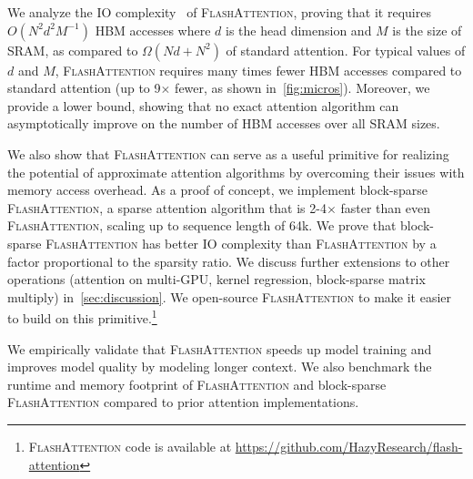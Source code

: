 We analyze the IO complexity~\citep{aggarwal1988input} of \textsc{FlashAttention}, proving that it requires $O(N^2 d^2 M^{-1})$ HBM accesses where $d$ is the head dimension and $M$ is the size of SRAM, as compared to $\Omega(Nd + N^2)$ of standard attention. For typical values of $d$ and $M$, \textsc{FlashAttention} requires many times fewer HBM accesses compared to standard attention (up to 9$\times$ fewer, as shown in~\ref{fig:micros}).
Moreover, we provide a lower bound, showing that no exact attention algorithm can asymptotically improve on the number of HBM accesses over all SRAM sizes.

We also show that \textsc{FlashAttention} can serve as a useful primitive for realizing the potential of approximate attention algorithms by overcoming their issues with memory access overhead. As a proof of concept, we implement block-sparse \textsc{FlashAttention}, a sparse attention algorithm that is 2-4$\times$ faster than even \textsc{FlashAttention}, scaling up to sequence length of 64k. We prove that block-sparse \textsc{FlashAttention} has better IO complexity than \textsc{FlashAttention} by a factor proportional to the sparsity ratio. We discuss further extensions to other operations (attention on multi-GPU, kernel regression, block-sparse matrix multiply) in~\ref{sec:discussion}.
We open-source \textsc{FlashAttention} to make it easier to build on this primitive.\footnote{\textsc{FlashAttention} code is available at \url{https://github.com/HazyResearch/flash-attention}}

We empirically validate that \textsc{FlashAttention} speeds up model training and improves model quality by modeling longer context. We also benchmark the runtime and memory footprint of \textsc{FlashAttention} and block-sparse \textsc{FlashAttention} compared to prior attention implementations.

